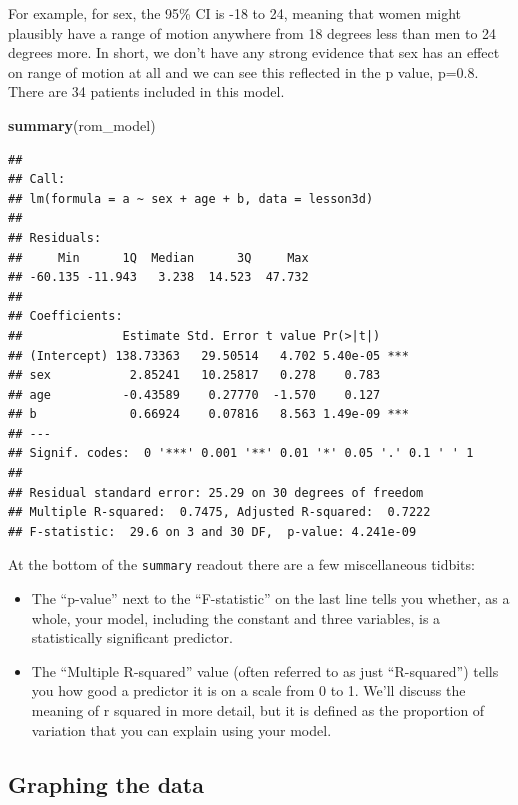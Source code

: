 \documentclass[]{book}
\newenvironment{Shaded}{\begin{snugshade}}{\end{snugshade}}
\newcommand{\KeywordTok}[1]{\textcolor[rgb]{0.13,0.29,0.53}{\textbf{#1}}}
\newcommand{\NormalTok}[1]{#1}
\begin{document}
For example, for sex, the 95\% CI is -18 to 24, meaning that women might plausibly have a range of motion anywhere from 18 degrees less than men to 24 degrees more. In short, we don't have any strong evidence that sex has an effect on range of motion at all and we can see this reflected in the p value, p=0.8. There are 34 patients included in this model.

\begin{Shaded}
\begin{Highlighting}[]
\KeywordTok{summary}\NormalTok{(rom_model)}
\end{Highlighting}
\end{Shaded}

\begin{verbatim}
## 
## Call:
## lm(formula = a ~ sex + age + b, data = lesson3d)
## 
## Residuals:
##     Min      1Q  Median      3Q     Max 
## -60.135 -11.943   3.238  14.523  47.732 
## 
## Coefficients:
##              Estimate Std. Error t value Pr(>|t|)    
## (Intercept) 138.73363   29.50514   4.702 5.40e-05 ***
## sex           2.85241   10.25817   0.278    0.783    
## age          -0.43589    0.27770  -1.570    0.127    
## b             0.66924    0.07816   8.563 1.49e-09 ***
## ---
## Signif. codes:  0 '***' 0.001 '**' 0.01 '*' 0.05 '.' 0.1 ' ' 1
## 
## Residual standard error: 25.29 on 30 degrees of freedom
## Multiple R-squared:  0.7475, Adjusted R-squared:  0.7222 
## F-statistic:  29.6 on 3 and 30 DF,  p-value: 4.241e-09
\end{verbatim}

At the bottom of the \texttt{summary} readout there are a few miscellaneous tidbits:

\begin{itemize}
\item
  The ``p-value'' next to the ``F-statistic'' on the last line tells you whether, as a whole, your model, including the constant and three variables, is a statistically significant predictor.
\item
  The ``Multiple R-squared'' value (often referred to as just ``R-squared'') tells you how good a predictor it is on a scale from 0 to 1. We'll discuss the meaning of r squared in more detail, but it is defined as the proportion of variation that you can explain using your model.
\end{itemize}

\hypertarget{graphing-the-data}{%
\subsection{Graphing the data}\label{graphing-the-data}}
\end{document}
